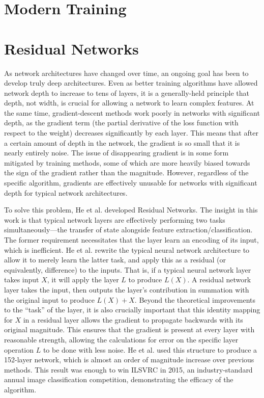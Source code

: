\section{Modern Training}



\section{Residual Networks}
As network architectures have changed over time, an ongoing goal has been to develop truly deep architectures.
Even as better training algorithms have allowed network depth to increase to tens of layers, it is a generally-held principle that depth, not width, is crucial for allowing a network to learn complex features.
At the same time, gradient-descent methods work poorly in networks with significant depth, as the gradient term (the partial derivative of the loss function with respect to the weight) decreases significantly by each layer.
This means that after a certain amount of depth in the network, the gradient is so small that it is nearly entirely noise.
The issue of disappearing gradient is in some form mitigated by training methods, some of which are more heavily biased towards the sign of the gradient rather than the magnitude.
However, regardless of the specific algorithm, gradients are effectively unusable for networks with significant depth for typical network architectures.

To solve this problem, He et al. \cite{he2016deep} developed Residual Networks.
The insight in this work is that typical network layers are effectively performing two tasks simultaneously---the transfer of state alongside feature extraction/classification.
The former requirement necessitates that the layer learn an encoding of its input, which is inefficient.
He et al. rewrite the typical neural network architecture to allow it to merely learn the latter task, and apply this as a residual (or equivalently, difference) to the inputs.
That is, if a typical neural network layer takes input $X$, it will apply the layer $L$ to produce $L(X)$.
A residual network layer takes the input, then outputs the layer's contribution in summation with the original input to produce $L(X) + X$.
Beyond the theoretical improvements to the ``task'' of the layer, it is also crucially important that this identity mapping for $X$ in a residual layer allows the gradient to propagate backwards with its original magnitude.
This ensures that the gradient is present at every layer with reasonable strength, allowing the calculations for error on the specific layer operation $L$ to be done with less noise.
He et al. used this structure to produce a 152-layer network, which is almost an order of magnitude increase over previous methods. 
This result was enough to win ILSVRC in 2015, an industry-standard annual image classification competition, demonstrating the efficacy of the algorithm.

